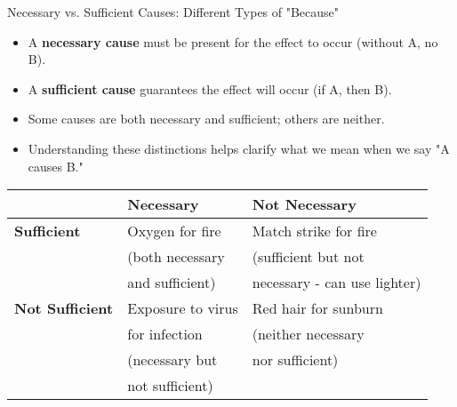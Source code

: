 \documentclass{beamer}
\begin{document}
\begin{frame}{Necessary vs. Sufficient Causes: Different Types of "Because"}
    \begin{itemize}
        \item A \textbf{necessary cause} must be present for the effect to occur (without A, no B).
        \item A \textbf{sufficient cause} guarantees the effect will occur (if A, then B).
        \item Some causes are both necessary and sufficient; others are neither.
        \item Understanding these distinctions helps clarify what we mean when we say "A causes B."
    \end{itemize}
    
    \begin{table}
        \centering
        \begin{tabular}{|l|l|l|}
            \hline
            & \textbf{Necessary} & \textbf{Not Necessary} \\
            \hline
            \textbf{Sufficient} & Oxygen for fire & Match strike for fire \\
                                & (both necessary & (sufficient but not \\
                                & and sufficient) & necessary - can use lighter) \\
            \hline
            \textbf{Not Sufficient} & Exposure to virus & Red hair for sunburn \\
                                    & for infection & (neither necessary \\
                                    & (necessary but & nor sufficient) \\
                                    & not sufficient) & \\
            \hline
        \end{tabular}
    \end{table}
\end{frame}
\end{document}

